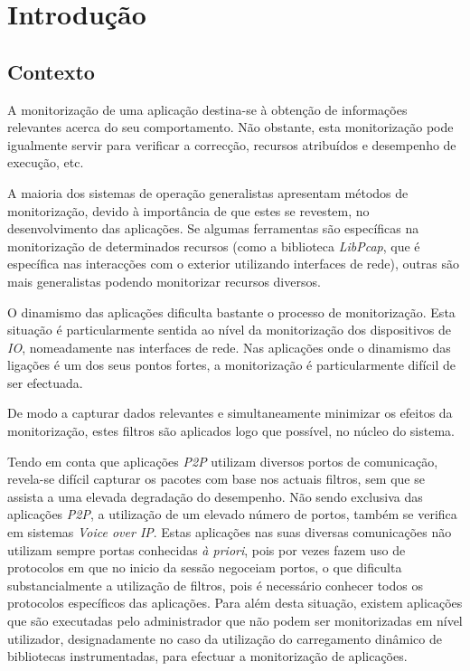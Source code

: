 \chapter{Introdução}\label{cap:introducao}

\section{Contexto}
\label{sec:intro_context}
A monitorização de uma aplicação destina-se à obtenção de informações relevantes acerca do seu comportamento.
Não obstante, esta monitorização pode igualmente servir para verificar a correcção, recursos atribuídos e desempenho de execução, etc.

A maioria dos sistemas de operação generalistas apresentam métodos de monitorização, devido à importância de que estes se revestem, no desenvolvimento das aplicações.
Se algumas ferramentas são específicas na monitorização de determinados recursos (como a biblioteca \textit{LibPcap}, que é específica nas interacções com o exterior utilizando interfaces de rede), outras são mais generalistas podendo monitorizar recursos diversos.

O dinamismo das aplicações dificulta bastante o processo de monitorização.
Esta situação é particularmente sentida ao nível da monitorização dos dispositivos de \textit{IO}, nomeadamente nas interfaces de rede.
Nas aplicações onde o dinamismo das ligações é um dos seus pontos fortes, a monitorização é particularmente difícil de ser efectuada.

De modo a capturar dados relevantes e simultaneamente minimizar os efeitos da monitorização, estes filtros são aplicados logo que possível, no núcleo do sistema.

Tendo em conta que aplicações \textit{P2P} utilizam diversos portos de comunicação, revela-se difícil capturar os pacotes com base nos actuais filtros, sem que se assista a uma elevada degradação do desempenho.
Não sendo exclusiva das aplicações \textit{P2P}, a utilização de um elevado número de portos, também se verifica em sistemas \textit{Voice over IP}.
Estas aplicações nas suas diversas comunicações não utilizam sempre portas conhecidas \textit{à priori}, pois por vezes fazem uso de protocolos em que no inicio da sessão negoceiam portos, o que dificulta substancialmente a utilização de filtros, pois é necessário conhecer todos os protocolos específicos das aplicações.
Para além desta situação, existem aplicações que são executadas pelo administrador que não podem ser monitorizadas em nível utilizador, designadamente no caso da utilização do carregamento dinâmico de bibliotecas instrumentadas, para efectuar a monitorização de aplicações.

